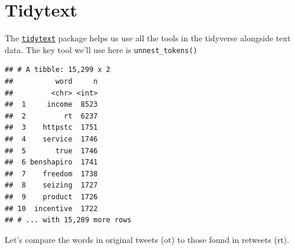 \documentclass[]{book}
\newenvironment{Shaded}{\begin{snugshade}}{\end{snugshade}}
\newcommand{\KeywordTok}[1]{\textcolor[rgb]{0.13,0.29,0.53}{\textbf{{#1}}}}
\newcommand{\DataTypeTok}[1]{\textcolor[rgb]{0.13,0.29,0.53}{{#1}}}
\newcommand{\DecValTok}[1]{\textcolor[rgb]{0.00,0.00,0.81}{{#1}}}
\newcommand{\CharTok}[1]{\textcolor[rgb]{0.31,0.60,0.02}{{#1}}}
\newcommand{\StringTok}[1]{\textcolor[rgb]{0.31,0.60,0.02}{{#1}}}
\newcommand{\OtherTok}[1]{\textcolor[rgb]{0.56,0.35,0.01}{{#1}}}
\newcommand{\NormalTok}[1]{{#1}}
\theoremstyle{definition}
\theoremstyle{definition}
\theoremstyle{remark}
\begin{document}
\section{Tidytext}\label{tidytext}

The \href{http://tidytextmining.com/}{\texttt{tidytext}} package helps
us use all the tools in the tidyverse alongside text data. The key tool
we'll use here is \texttt{unnest\_tokens()}

\begin{Shaded}
\end{Shaded}

\begin{verbatim}
## # A tibble: 15,299 x 2
##          word     n
##         <chr> <int>
##  1     income  8523
##  2         rt  6237
##  3    httpstc  1751
##  4    service  1746
##  5       true  1746
##  6 benshapiro  1741
##  7    freedom  1738
##  8    seizing  1727
##  9    product  1726
## 10  incentive  1722
## # ... with 15,289 more rows
\end{verbatim}

Let's compare the words in original tweets (ot) to those found in
retweets (rt).

\begin{Shaded}
\end{Shaded}
\end{document}
